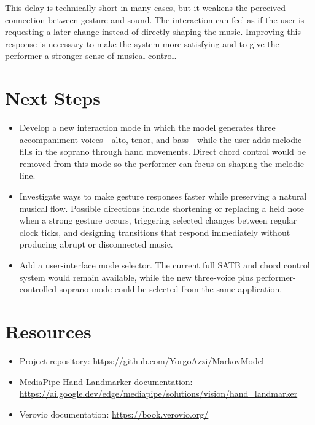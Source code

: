 \documentclass[11pt,a4paper]{article}
\begin{document}
This delay is technically short in many cases, but it weakens the perceived
connection between gesture and sound. The interaction can feel as if the user
is requesting a later change instead of directly shaping the music. Improving
this response is necessary to make the system more satisfying and to give the
performer a stronger sense of musical control.

\section{Next Steps}

\begin{itemize}
    \item Develop a new interaction mode in which the model generates three
    accompaniment voices---alto, tenor, and bass---while the user adds melodic
    fills in the soprano through hand movements. Direct chord control would be
    removed from this mode so the performer can focus on shaping the melodic
    line.
    \item Investigate ways to make gesture responses faster while preserving a
    natural musical flow. Possible directions include shortening or replacing
    a held note when a strong gesture occurs, triggering selected changes
    between regular clock ticks, and designing transitions that respond
    immediately without producing abrupt or disconnected music.
    \item Add a user-interface mode selector. The current full SATB and chord
    control system would remain available, while the new three-voice plus
    performer-controlled soprano mode could be selected from the same
    application.
\end{itemize}

\section{Resources}

\begin{itemize}
    \item Project repository:
    \url{https://github.com/YorgoAzzi/MarkovModel}
    \item MediaPipe Hand Landmarker documentation:
    \url{https://ai.google.dev/edge/mediapipe/solutions/vision/hand_landmarker}
    \item Verovio documentation:
    \url{https://book.verovio.org/}
\end{itemize}
\end{document}
